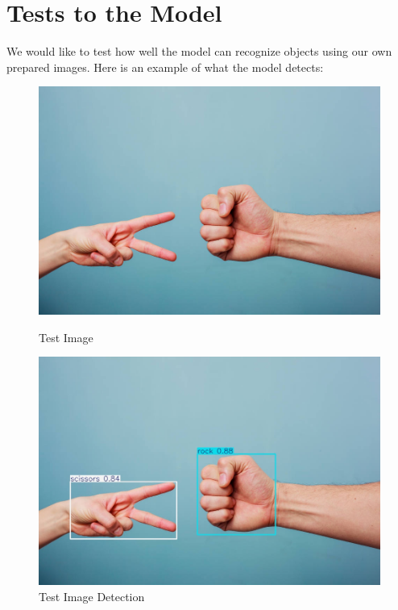 \documentclass[../main]{subfiles}
\begin{document}
\section{Tests to the Model}
We would like to test how well the model can recognize objects using our own prepared images. Here is an example of what the model detects:
\begin{figure}[H]
    \centering
    \begin{minipage}{0.48\textwidth}
        \centering
        \includegraphics[width=\linewidth]{./figures/try}
        \caption{Test Image}
        \label{fig:example1}
    \end{minipage}\hfill
    \begin{minipage}{0.48\textwidth}
        \centering
        \includegraphics[width=\linewidth]{./figures/res}
        \caption{Test Image Detection}
        \label{fig:example2}
    \end{minipage}
\end{figure}
\end{document}
